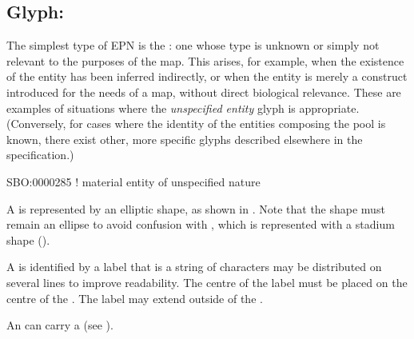 
\subsection{Glyph: }
\label{sec:unspecifiedEntity}

The simplest type of EPN is the : one whose type is unknown or simply not relevant to the purposes of the map.
This arises, for example, when the existence of the entity has been inferred indirectly, or when the entity is merely a construct introduced for the needs of a map, without direct biological relevance.
These are examples of situations where the \emph{unspecified entity} glyph is appropriate.
(Conversely, for cases where the identity of the entities composing the pool is known, there exist other, more specific glyphs described elsewhere in the specification.)

\begin{glyphDescription}

\glyphSboTerm
 SBO:0000285 ! material entity of unspecified nature



\glyphContainer
A  is represented by an elliptic shape, as shown in .
Note that the shape must remain an ellipse to avoid confusion with , which is represented with a stadium shape ().

\glyphLabel
A  is identified by a label  that is a string of characters  may be distributed on several lines to improve readability.
The centre of the label must be placed on the centre of the .
The label may extend outside of the .

\glyphAux
An  can carry a  (see ).

\end{glyphDescription}

